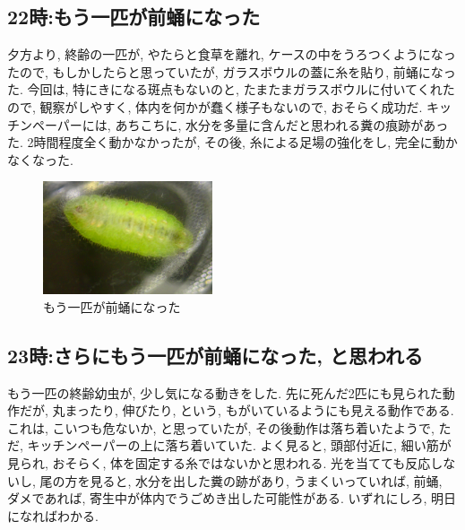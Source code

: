 \documentclass{jsarticle}
\begin{document}
\subsection{22時:もう一匹が前蛹になった}
夕方より, 終齢の一匹が, やたらと食草を離れ, ケースの中をうろつくようになったので, 
もしかしたらと思っていたが, ガラスボウルの蓋に糸を貼り, 前蛹になった. 
今回は, 特にきになる斑点もないのと, たまたまガラスボウルに付いてくれたので, 観察がしやすく, 
体内を何かが蠢く様子もないので, おそらく成功だ. 
キッチンペーパーには, あちこちに, 水分を多量に含んだと思われる糞の痕跡があった. 
2時間程度全く動かなかったが, その後, 糸による足場の強化をし, 完全に動かなくなった. 
\begin{figure}[htbp]
  \begin{center}
    \includegraphics[width=5cm]{photo4/prePupa.JPG}
  \end{center}
  \caption{もう一匹が前蛹になった}
\end{figure}

\subsection{23時:さらにもう一匹が前蛹になった, と思われる}
もう一匹の終齢幼虫が, 少し気になる動きをした. 先に死んだ2匹にも見られた動作だが, 
丸まったり, 伸びたり, という, もがいているようにも見える動作である. 
これは, こいつも危ないか, と思っていたが, その後動作は落ち着いたようで, ただ, キッチンペーパーの上に落ち着いていた. 
よく見ると, 頭部付近に, 細い筋が見られ, おそらく, 体を固定する糸ではないかと思われる. 
光を当てても反応しないし, 尾の方を見ると, 水分を出した糞の跡があり, うまくいっていれば, 前蛹, 
ダメであれば, 寄生中が体内でうごめき出した可能性がある. 
いずれにしろ, 明日になればわかる. 
\end{document}
